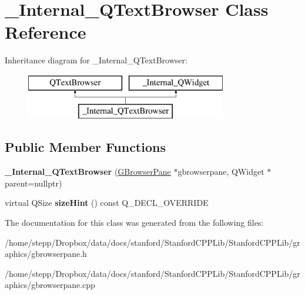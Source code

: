 \hypertarget{class__Internal__QTextBrowser}{}\section{\+\_\+\+Internal\+\_\+\+Q\+Text\+Browser Class Reference}
\label{class__Internal__QTextBrowser}
Inheritance diagram for \+\_\+\+Internal\+\_\+\+Q\+Text\+Browser\+:\begin{figure}[H]
\begin{center}
\leavevmode
\includegraphics[height=2.000000cm]{class__Internal__QTextBrowser}
\end{center}
\end{figure}
\subsection*{Public Member Functions}
\begin{DoxyCompactItemize}
\item 
\mbox{\label{class__Internal__QTextBrowser_a7d1c516454f49f3832ae50547000f14c}} 
{\bfseries \+\_\+\+Internal\+\_\+\+Q\+Text\+Browser} (\mbox{\hyperlink{classGBrowserPane}{G\+Browser\+Pane}} $\ast$gbrowserpane, Q\+Widget $\ast$parent=nullptr)
\item 
\mbox{\label{class__Internal__QTextBrowser_abdc72c9e436914daabcf00799e2212e8}} 
virtual Q\+Size {\bfseries size\+Hint} () const Q\+\_\+\+D\+E\+C\+L\+\_\+\+O\+V\+E\+R\+R\+I\+DE
\end{DoxyCompactItemize}


The documentation for this class was generated from the following files\+:\begin{DoxyCompactItemize}
\item 
/home/stepp/\+Dropbox/data/docs/stanford/\+Stanford\+C\+P\+P\+Lib/\+Stanford\+C\+P\+P\+Lib/graphics/gbrowserpane.\+h\item 
/home/stepp/\+Dropbox/data/docs/stanford/\+Stanford\+C\+P\+P\+Lib/\+Stanford\+C\+P\+P\+Lib/graphics/gbrowserpane.\+cpp\end{DoxyCompactItemize}
